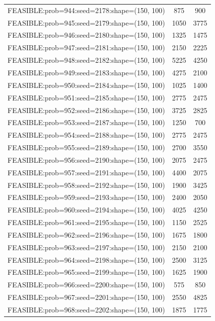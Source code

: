 \begin{longtable}{lcc}
FEASIBLE:prob=944:seed=2178:shape=(150, 100) &      875 &   900 \\
FEASIBLE:prob=945:seed=2179:shape=(150, 100) &     1050 &  3775 \\
FEASIBLE:prob=946:seed=2180:shape=(150, 100) &     1325 &  1475 \\
FEASIBLE:prob=947:seed=2181:shape=(150, 100) &     2150 &  2225 \\
FEASIBLE:prob=948:seed=2182:shape=(150, 100) &     5225 &  4250 \\
FEASIBLE:prob=949:seed=2183:shape=(150, 100) &     4275 &  2100 \\
FEASIBLE:prob=950:seed=2184:shape=(150, 100) &     1025 &  1400 \\
FEASIBLE:prob=951:seed=2185:shape=(150, 100) &     2775 &  2475 \\
FEASIBLE:prob=952:seed=2186:shape=(150, 100) &     3725 &  2825 \\
FEASIBLE:prob=953:seed=2187:shape=(150, 100) &     1250 &   700 \\
FEASIBLE:prob=954:seed=2188:shape=(150, 100) &     2775 &  2475 \\
FEASIBLE:prob=955:seed=2189:shape=(150, 100) &     2700 &  3550 \\
FEASIBLE:prob=956:seed=2190:shape=(150, 100) &     2075 &  2475 \\
FEASIBLE:prob=957:seed=2191:shape=(150, 100) &     4400 &  2075 \\
FEASIBLE:prob=958:seed=2192:shape=(150, 100) &     1900 &  3425 \\
FEASIBLE:prob=959:seed=2193:shape=(150, 100) &     2400 &  2050 \\
FEASIBLE:prob=960:seed=2194:shape=(150, 100) &     4025 &  4250 \\
FEASIBLE:prob=961:seed=2195:shape=(150, 100) &     1150 &  2525 \\
FEASIBLE:prob=962:seed=2196:shape=(150, 100) &     1675 &  1800 \\
FEASIBLE:prob=963:seed=2197:shape=(150, 100) &     2150 &  2100 \\
FEASIBLE:prob=964:seed=2198:shape=(150, 100) &     2500 &  3125 \\
FEASIBLE:prob=965:seed=2199:shape=(150, 100) &     1625 &  1900 \\
FEASIBLE:prob=966:seed=2200:shape=(150, 100) &      575 &   850 \\
FEASIBLE:prob=967:seed=2201:shape=(150, 100) &     2550 &  4825 \\
FEASIBLE:prob=968:seed=2202:shape=(150, 100) &     1875 &  1775 \\

\end{longtable}
